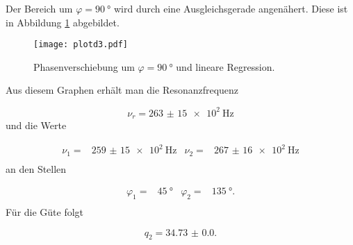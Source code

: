 Der Bereich um $\varphi = \SI{90}{\degree}$ wird durch eine Ausgleichsgerade
angenähert. Diese ist in Abbildung \ref{fig:Phaseklein} abgebildet.

\begin{figure}[h]
  \centering
  \texttt{[image: plotd3.pdf]}
  \caption{Phasenverschiebung um $\varphi = \SI{90}{\degree}$ und lineare
  Regression.}
  \label{fig:Phaseklein}
\end{figure}

Aus diesem Graphen erhält man die Resonanzfrequenz

\begin{equation}
  \nu_r = \SI{263(15)e2}{\hertz}
\end{equation}
und die Werte

\begin{align}
  \nu_1 = & \SI{259(15)e2}{\hertz} & \nu_2 = & \SI{267(16)e2}{\hertz} \\
\end{align}
an den Stellen

\begin{align}
  \varphi_1 = & \SI{45}{\degree} & \varphi_2 = & \SI{135}{\degree}. \\
\end{align}
Für die Güte folgt

\begin{equation}
  q_2 = \num{34.73(0)}.
\end{equation}
